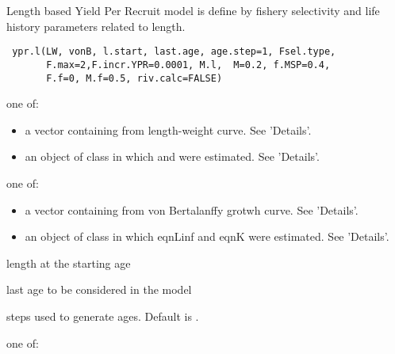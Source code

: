 \documentclass[a4paper]{book}
\begin{document}
\newpage
{}
%
\begin{Description}\relax
Length based Yield Per Recruit model is define by fishery selectivity and life history parameters related to length. 
\end{Description}
%
\begin{Usage}
\begin{verbatim}
 ypr.l(LW, vonB, l.start, last.age, age.step=1, Fsel.type, 
       F.max=2,F.incr.YPR=0.0001, M.l,  M=0.2, f.MSP=0.4, 
       F.f=0, M.f=0.5, riv.calc=FALSE)

\end{verbatim}
\end{Usage}
%
\begin{Arguments}
\begin{ldescription}
\item[\code{LW}] one of:
\begin{itemize}

\item a vector containing  from length-weight curve. See 'Details'. 
\item an object of class  in which \eqn{\alpha}{} and \eqn{\beta}{} were estimated. See 'Details'.        

\end{itemize}


\item[\code{vonB}] one of:
\begin{itemize}

\item a vector containing  from von Bertalanffy grotwh curve. See 'Details'. 
\item an object of class  in which eqnLinf and eqnK were estimated. See 'Details'.        

\end{itemize}


\item[\code{l.start}] length at the starting age

\item[\code{last.age}] last age to be considered in the model

\item[\code{age.step}] steps used to generate ages. Default is .

\item[\code{Fsel.type}] one of:
\begin{itemize}


\end{itemize}
\end{ldescription}
\end{Arguments}
\end{document}
